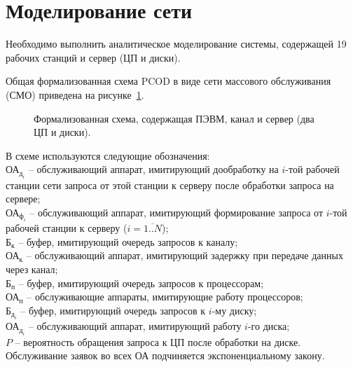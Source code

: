 \newpage

\section{Моделирование сети}

Необходимо выполнить аналитическое моделирование системы, содержащей 19 рабочих станций и сервер (ЦП и диски).\par\bigskip

Общая формализованная схема PCOD в виде сети массового обслуживания (СМО) приведена на рисунке~\ref{pic:9_1_model_general}.

\begin{figure}[h]
\caption{Формализованная схема, содержащая ПЭВМ, канал и сервер (два ЦП и диски).}
\label{pic:9_1_model_general}
\end{figure}

В схеме используются следующие обозначения:\\
$\text{ОА}_{\text{д}_i}$ -- обслуживающий аппарат, имитирующий дообработку на $i$-той рабочей станции сети запроса от этой станции к серверу после обработки запроса на сервере;\\
$\text{ОА}_{\text{ф}_i}$ -- обслуживающий аппарат, имитирующий формирование запроса от $i$-той рабочей станции к серверу ($i = \overline{1..N}$);\\
$\text{Б}_{\text{к}}$ -- буфер, имитирующий очередь запросов к каналу;\\
$\text{ОА}_{\text{к}}$ -- обслуживающий аппарат, имитирующий задержку при передаче данных через канал;\\
$\text{Б}_{\text{п}}$ -- буфер, имитирующий очередь запросов к процессорам;\\
$\text{ОА}_{\text{п}}$ -- обслуживающие аппараты, имитирующие работу процессоров;\\
$\text{Б}_{\text{д}_i}$ -- буфер, имитирующий очередь запросов к $i$-му диску;\\
$\text{ОА}_{\text{д}_i}$ -- обслуживающий аппарат, имитирующий работу $i$-го диска;\\
$P$ -- вероятность обращения запроса к ЦП после обработки на диске. Обслуживание заявок во всех ОА подчиняется экспоненциальному закону.\par\bigskip


